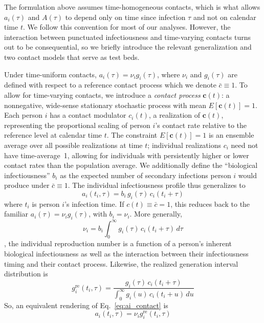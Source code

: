 The formulation above assumes time-homogeneous contacts, which is what allows $a_i(\tau)$ and $A(\tau)$ to depend only on time since infection $\tau$ and not on calendar time $t$. We follow this convention for most of our analyses. However, the interaction between punctuated infectiousness and time-varying contacts turns out to be consequential, so we briefly introduce the relevant generalization and two contact models that serve as test beds.

Under time-uniform contacts, $a_i(\tau) = \nu_i g_i(\tau)$, where $\nu_i$ and $g_i(\tau)$ are defined with respect to a reference contact process which we denote $\bar{c} \equiv 1$. To allow for time-varying contacts, we introduce a \emph{contact process} $\bm{c}(t)$: a nonnegative, wide-sense stationary stochastic process with mean $E[\bm{c}(t)] = 1$. Each person $i$ has a contact modulator $c_i(t)$, a realization of $\bm{c}(t)$, representing the proportional scaling of person $i$'s contact rate relative to the reference level at calendar time $t$. The constraint $E[\bm{c}(t)] = 1$ is an ensemble average over all possible realizations at time $t$; individual realizations $c_i$ need not have time-average~1, allowing for individuals with persistently higher or lower contact rates than the population average. We additionally define the ``biological infectiousness'' $b_i$ as the expected number of secondary infections person $i$ would produce under $\bar{c} \equiv 1$. The individual infectiousness profile thus generalizes to
%
\begin{equation}
    a_i(t_i, \tau) = b_i\,g_i(\tau)\,c_i(t_i + \tau)
    \label{eq:ai_contact}
\end{equation}
%
where $t_i$ is person $i$'s infection time.  If $c(t) \equiv \bar{c} = 1$, this reduces back to the familiar $a_i(\tau) = \nu_i g_i(\tau)$, with $b_i = \nu_i$. More generally, 
\begin{equation}
    \nu_i = b_i \int_0^\infty g_i(\tau)\,c_i(t_i + \tau)\,d\tau
    \label{eq:nu_rel}
\end{equation}
\ie, the individual reproduction number is a function of a person's inherent biological infectiousness as well as the interaction between their infectiousness timing and their contact process. Likewise, the realized generation interval distribution is 
\begin{equation}
    g_i^\text{re}(t_i, \tau) = \frac{g_i(\tau)\,c_i(t_i + \tau)}{\displaystyle\int_0^\infty g_i(u)\,c_i(t_i + u)\,du}
    \label{eq:gi_rel}
\end{equation}
So, an equivalent rendering of Eq.~\ref{eq:ai_contact} is 
\begin{equation}
a_i(t_i, \tau) = \nu_i g_i^{\text{re}}(t_i, \tau)
\end{equation}


